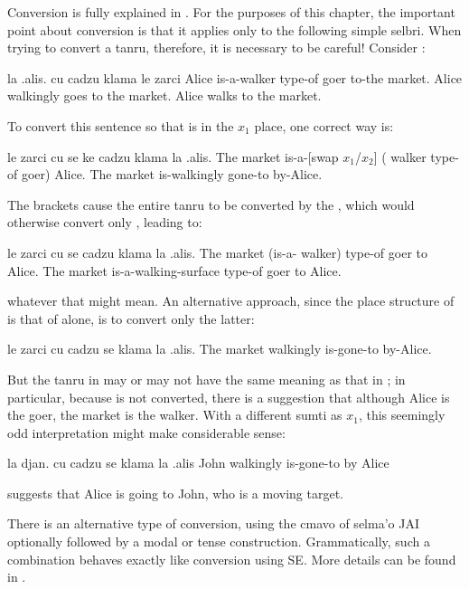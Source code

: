 Conversion is fully explained in . For the purposes of this
    chapter, the important point about conversion is that it
    applies only to the following simple selbri. When trying to
    convert a tanru, therefore, it is necessary to be careful!
    Consider :
\begin{example}
la .alis. cu cadzu klama le zarci\n
Alice is-a-walker type-of goer to-the market.\n
Alice walkingly goes to the market.\n
Alice walks to the market.
\end{example}

To convert this sentence so that  is in the $x_1$
    place, one correct way is:
\begin{example}
le zarci cu se ke cadzu klama  la .alis.\n
The market is-a-[swap $x_1$/$x_2$] ( walker type-of goer) Alice.\n
The market is-walkingly gone-to by-Alice.
\end{example}

The  brackets cause the entire tanru to be
    converted by the , which would otherwise convert only
    , leading to:
\begin{example}
le zarci cu se cadzu\n
\T	klama la .alis.\n
The market (is-a- walker)\n
\T	type-of goer to Alice.\n
The market is-a-walking-surface type-of goer to Alice.
\end{example}

{\noindent}whatever that might mean. An alternative approach, since the
    place structure of  is that of  alone,
    is to convert only the latter:
\begin{example}
le zarci cu cadzu se klama la .alis.\n
The market walkingly is-gone-to by-Alice.
\end{example}

But the tanru in  may or
    may not have the same meaning as that in ; in particular, because
     is not converted, there is a suggestion that although
    Alice is the goer, the market is the walker. With a different
    sumti as $x_1$, this seemingly odd interpretation might make
    considerable sense:
\begin{example}
la djan. cu cadzu se klama la .alis\n
John walkingly is-gone-to by Alice
\end{example}

{\noindent}suggests that Alice is going to John, who is a moving target. 

There is an alternative type of conversion, using the cmavo
     of selma'o JAI optionally followed by a modal or tense
    construction. Grammatically, such a combination behaves exactly
    like conversion using SE. More details can be found in .



